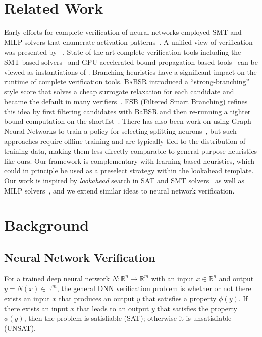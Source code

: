 \documentclass{article}
\begin{document}
\section{Related Work}\label{sec:related}

Early efforts for complete verification of neural networks employed SMT and MILP solvers that enumerate activation patterns~\cite{katz2017reluplex}. A unified \bab view of verification was presented by ~\cite{bunel2020branch}. State-of-the-art complete verification tools including the SMT-based solvers~\cite{katz2019marabou,wu2024marabou} and GPU-accelerated bound-propagation-based tools~\cite{wang2021beta,xu2020automatic,zhang2022general,zhou2024scalable,shi2024genbab} can be viewed as instantiations of \bab. Branching heuristics have a significant impact on the runtime of complete verification tools. \textsc{BaBSR} introduced a ``strong-branching'' style score that solves a cheap surrogate relaxation for each candidate and became the default in many verifiers~\cite{bunel2020branch}. \textsc{FSB} (Filtered Smart Branching) refines this idea by first filtering candidates with BaBSR and then re-running a tighter bound computation on the shortlist~\cite{de2021scaling}. There has also been work on using Graph Neural Networks to train a policy for selecting splitting neurons~\cite{lu2019neural}, but such approaches require offline training and are typically tied to the distribution of training data, making them less directly comparable to general-purpose heuristics like ours. Our framework is complementary with learning-based heuristics, which could in principle be used as a preselect strategy within the lookahead template. Our work is inspired by \emph{lookahead} search in SAT and SMT solvers~\cite{heule2009lookahead} as well as MILP solvers~\cite{Glankwamdee2006Lookahead}, and we extend similar ideas to neural network verification.

\section{Background}\label{sec:prelim}
\subsection{Neural Network Verification}
For a trained deep neural network $N: \mathbb{R}^n \rightarrow \mathbb{R}^m$ with an input $x \in \mathbb{R}^n$ and output $y = N(x) \in \mathbb{R}^m$, the general DNN verification problem is whether or not there exists an input $x$ that produces an output $y$ that satisfies a property $\phi(y)$. If there exists an input $x$ that leads to an output $y$ that satisfies the property $\phi(y)$, then the problem is satisfiable (SAT); otherwise it is unsatisfiable (UNSAT).
\end{document}
